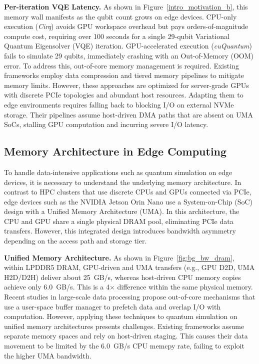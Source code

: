 \noindent\textbf{Per-iteration VQE Latency. }As shown in Figure~\ref{intro_motivation_b}, this memory wall manifests as the qubit count grows on edge devices. CPU-only execution (\textit{Cirq}) avoids GPU workspace overhead but pays orders-of-magnitude compute cost, requiring over 100 seconds for a single 29-qubit Variational Quantum Eigensolver (VQE) iteration. GPU-accelerated execution (\textit{cuQuantum}) fails to simulate 29 qubits, immediately crashing with an Out-of-Memory (OOM) error. To address this, out-of-core memory management is required. Existing frameworks employ data compression and tiered memory pipelines to mitigate memory limits. However, these approaches are optimized for server-grade GPUs with discrete PCIe topologies and abundant host resources. Adapting them to edge environments requires falling back to blocking I/O on external NVMe storage. Their pipelines assume host-driven DMA paths that are absent on UMA SoCs, stalling GPU computation and incurring severe I/O latency.





\subsection{Memory Architecture in Edge Computing}\label{back2}

To handle data-intensive applications such as quantum simulation on edge devices, it is necessary to understand the underlying memory architecture. In contrast to HPC clusters that use discrete CPUs and GPUs connected via PCIe, edge devices such as the NVIDIA Jetson Orin Nano use a System-on-Chip (SoC) design with a Unified Memory Architecture (UMA). In this architecture, the CPU and GPU share a single physical DRAM pool, eliminating PCIe data transfers. However, this integrated design introduces bandwidth asymmetry depending on the access path and storage tier.

\noindent\textbf{Unified Memory Architecture. }
As shown in Figure~\ref{fig:bg_bw_dram}, within LPDDR5 DRAM, GPU-driven and UMA transfers (e.g., GPU D2D, UMA H2D/D2H) deliver about 25~GB/s, whereas host-driven CPU memory copies achieve only 6.0~GB/s. This is a 4$\times$ difference within the same physical memory. Recent studies in large-scale data processing propose out-of-core mechanisms that use a user-space buffer manager to prefetch data and overlap I/O with computation. However, applying these techniques to quantum simulation on unified memory architectures presents challenges. Existing frameworks assume separate memory spaces and rely on host-driven staging. This causes their data movement to be limited by the 6.0~GB/s CPU memcpy rate, failing to exploit the higher UMA bandwidth.


